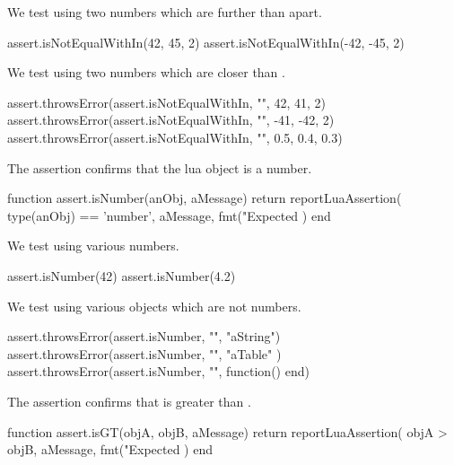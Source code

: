 
We test using two numbers which are further than  apart. 

\startLuaTest
  assert.isNotEqualWithIn(42, 45, 2)
  assert.isNotEqualWithIn(-42, -45, 2)
\stopLuaTest
\stopTestCase


We test using two numbers which are closer than . 

\startLuaTest
  assert.throwsError(assert.isNotEqualWithIn, "", 42, 41, 2)
  assert.throwsError(assert.isNotEqualWithIn, "", -41, -42, 2)
  assert.throwsError(assert.isNotEqualWithIn, "", 0.5, 0.4, 0.3)
\stopLuaTest
\stopTestSuite


The  assertion confirms that the lua object is a 
number. 

\startLuaCode
function assert.isNumber(anObj, aMessage)
  return reportLuaAssertion(
    type(anObj) == 'number',
    aMessage,
    fmt("Expected %
  )
end
\stopLuaCode


We test using various numbers.

\startLuaTest
  assert.isNumber(42)
  assert.isNumber(4.2)
\stopLuaTest
\stopTestCase


We test using various objects which are not numbers. 

\startLuaTest
  assert.throwsError(assert.isNumber, "", "aString")
  assert.throwsError(assert.isNumber, "", { "aTable" })
  assert.throwsError(assert.isNumber, "", function() end)
\stopLuaTest
\stopTestCase

\stopTestSuite


The  assertion confirms that  is greater than 
. 

\startLuaCode
function assert.isGT(objA, objB, aMessage)
  return reportLuaAssertion(
    objA > objB,
    aMessage,
    fmt("Expected %
  )
end
\stopLuaCode


